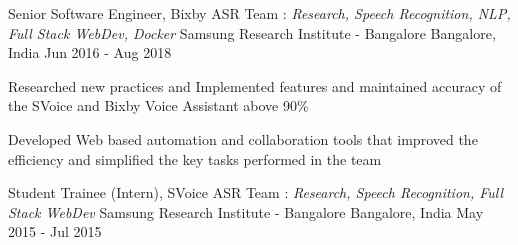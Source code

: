 

\begin{cventries}

  \cventry
    {Senior Software Engineer, Bixby ASR Team : \textit{Research, Speech Recognition, NLP, Full Stack WebDev, Docker}} %
    {Samsung Research Institute - Bangalore} %
    {Bangalore, India} %
    {Jun 2016 - Aug 2018} %
    {
      \begin{cvitems}
      \item{Researched new practices and Implemented features and maintained accuracy of the SVoice and Bixby Voice Assistant above 90\%}
      \item{Developed Web based automation and collaboration tools that improved the efficiency and simplified the key tasks performed in the team}
      \end{cvitems}
    }

  \cventry
    {Student Trainee (Intern), SVoice ASR Team : \textit{Research, Speech Recognition, Full Stack WebDev}} %
    {Samsung Research Institute - Bangalore} %
    {Bangalore, India} %
    {May 2015 - Jul 2015} %
    {
    }


\end{cventries}

